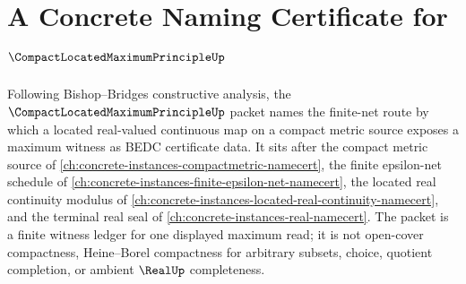 \chapter{A Concrete Naming Certificate for $\CompactLocatedMaximumPrincipleUp$}
\label{ch:concrete-instances-compact-located-maximum-principle-namecert}

Following Bishop--Bridges constructive analysis, the $\CompactLocatedMaximumPrincipleUp$ packet names the finite-net route by which a located real-valued continuous map on a compact metric source exposes a maximum witness as BEDC certificate data. It sits after the compact metric source of \autoref{ch:concrete-instances-compactmetric-namecert}, the finite epsilon-net schedule of \autoref{ch:concrete-instances-finite-epsilon-net-namecert}, the located real continuity modulus of \autoref{ch:concrete-instances-located-real-continuity-namecert}, and the terminal real seal of \autoref{ch:concrete-instances-real-namecert}. The packet is a finite witness ledger for one displayed maximum read; it is not open-cover compactness, Heine--Borel compactness for arbitrary subsets, choice, quotient completion, or ambient $\RealUp$ completeness.

